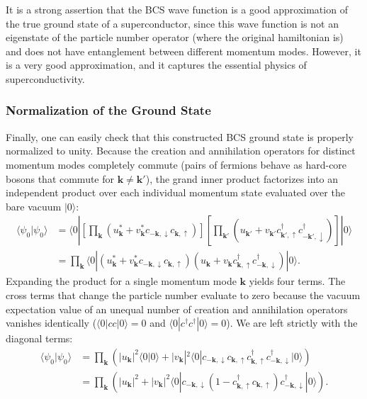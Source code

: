 \begin{remark}
    It is a strong assertion that the BCS wave function is a good approximation of the true ground state of a superconductor, since this wave function is not an eigenstate of the particle number operator (where the original hamiltonian is) and does not have entanglement between different momentum modes. However, it is a very good approximation, and it captures the essential physics of superconductivity.
\end{remark}

\subsubsection{Normalization of the Ground State}

Finally, one can easily check that this constructed BCS ground state is properly normalized to unity. Because the creation and annihilation operators for distinct momentum modes completely commute (pairs of fermions behave as hard-core bosons that commute for \( \mathbf{k} \neq \mathbf{k}' \)), the grand inner product factorizes into an independent product over each individual momentum state evaluated over the bare vacuum \( |0\rangle \):
\[
    \begin{aligned}
        \langle \psi_0 | \psi_0 \rangle & = \langle 0 | \left[ \prod_{\mathbf{k}} \left( u_{\mathbf{k}}^* + v_{\mathbf{k}}^* c_{-\mathbf{k},\downarrow} c_{\mathbf{k},\uparrow} \right) \right] \left[ \prod_{\mathbf{k}'} \left( u_{\mathbf{k}'} + v_{\mathbf{k}'} c_{\mathbf{k}',\uparrow}^\dagger c_{-\mathbf{k}',\downarrow}^\dagger \right) \right] | 0 \rangle \\
                                        & = \prod_{\mathbf{k}} \langle 0 | \left( u_{\mathbf{k}}^* + v_{\mathbf{k}}^* c_{-\mathbf{k},\downarrow} c_{\mathbf{k},\uparrow} \right) \left( u_{\mathbf{k}} + v_{\mathbf{k}} c_{\mathbf{k},\uparrow}^\dagger c_{-\mathbf{k},\downarrow}^\dagger \right) | 0 \rangle.
    \end{aligned}
\]
Expanding the product for a single momentum mode \( \mathbf{k} \) yields four terms. The cross terms that change the particle number evaluate to zero because the vacuum expectation value of an unequal number of creation and annihilation operators vanishes identically (\( \langle 0 | c c | 0 \rangle = 0 \) and \( \langle 0 | c^\dagger c^\dagger | 0 \rangle = 0 \)). We are left strictly with the diagonal terms:
\[
    \begin{aligned}
        \langle \psi_0 | \psi_0 \rangle & = \prod_{\mathbf{k}} \left( |u_{\mathbf{k}}|^2 \langle 0 | 0 \rangle + |v_{\mathbf{k}}|^2 \langle 0 | c_{-\mathbf{k},\downarrow} c_{\mathbf{k},\uparrow} c_{\mathbf{k},\uparrow}^\dagger c_{-\mathbf{k},\downarrow}^\dagger | 0 \rangle \right) \\
                                        & = \prod_{\mathbf{k}} \left( |u_{\mathbf{k}}|^2 + |v_{\mathbf{k}}|^2 \langle 0 | c_{-\mathbf{k},\downarrow} (1 - c_{\mathbf{k},\uparrow}^\dagger c_{\mathbf{k},\uparrow}) c_{-\mathbf{k},\downarrow}^\dagger | 0 \rangle \right).
    \end{aligned}
\]
